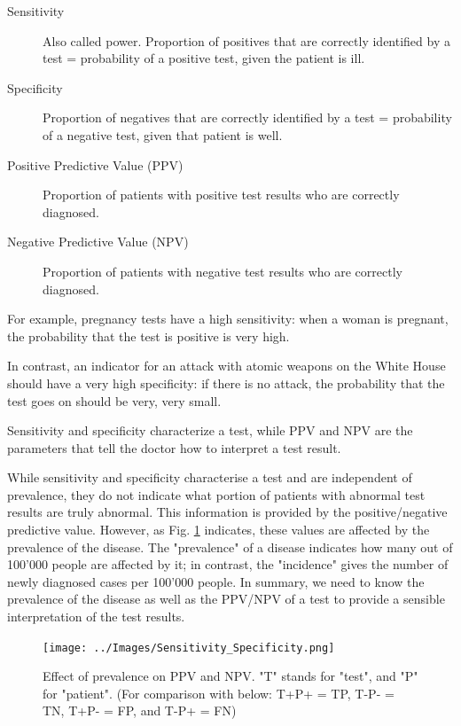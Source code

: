 \begin{description}
  \item[Sensitivity] Also called \gls{power}. Proportion of positives that are correctly identified by a test = probability of a positive test, given the patient is ill.
  \item[Specificity] Proportion of negatives that are correctly identified by a test = probability of a negative test, given that patient is well.
  \item[Positive Predictive Value (PPV)] Proportion of patients with positive test results who are correctly diagnosed.
  \item[Negative Predictive Value (NPV)] Proportion of patients with negative test results who are correctly diagnosed.
\end{description}

For example, pregnancy tests have a high sensitivity: when a woman is pregnant, the probability that the test is positive is very high.

In contrast, an indicator for an attack with atomic weapons on the White House should have a very high specificity: if there is no attack, the probability that the test goes on should be very, very small.

Sensitivity and specificity characterize a test, while PPV and NPV are the parameters that tell the doctor how to interpret a test result.

While sensitivity and specificity characterise a test and are independent of prevalence, they do not indicate what portion of patients with abnormal test results are truly abnormal. This information is provided by the positive/negative predictive value. However, as Fig. \ref{fig:prevalence} indicates, these values are affected by the prevalence  of the disease. The "prevalence" of a disease indicates how many out of 100'000 people are affected by it; in contrast, the "incidence" gives the number of newly diagnosed cases per 100'000 people. In summary, we need to know the prevalence of the disease as well as the PPV/NPV of a test to provide a sensible interpretation of the test results.

\begin{figure}[ht]
  \centering
  \texttt{[image: ../Images/Sensitivity\_Specificity.png]}\\
  \caption{Effect of prevalence on PPV and NPV. "T" stands for "test", and "P" for "patient". (For comparison with below: T+P+ = TP, T-P- = TN, T+P- = FP, and T-P+ = FN)} \label{fig:prevalence}
\end{figure}

